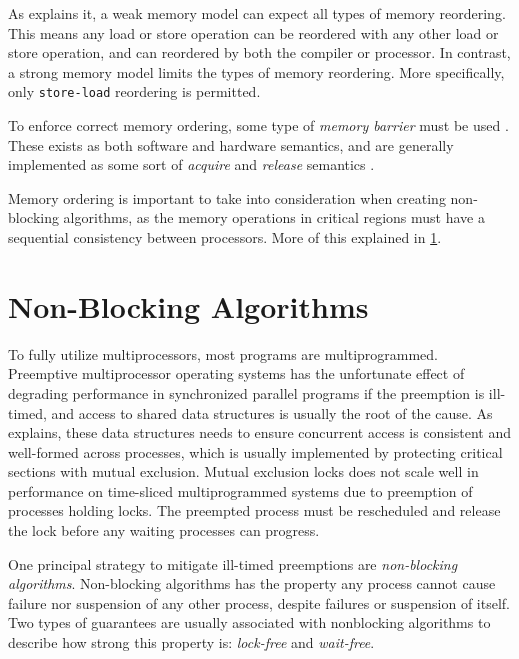 As \citet{preshing2012weakstrong} explains it, a weak memory model can expect all types of memory reordering. This means any load or store operation can be reordered with any other load or store operation, and can reordered by both the compiler or processor. In contrast, a strong memory model limits the types of memory reordering. More specifically, only \texttt{store\hyp{}load} reordering is permitted. 

To enforce correct memory ordering, some type of \textit{memory barrier} must be used \citep{preshing2012barriers,preshing2012lockfree}. These exists as both software and hardware semantics, and are generally implemented as some sort of \textit{acquire} and \textit{release} semantics \citep{preshing2012acquire}.

Memory ordering is important to take into consideration when creating non\hyp{}blocking algorithms, as the memory operations in critical regions must have a sequential consistency between processors. More of this explained in \cref{sec:nonblocking_algorithms}.


\section{Non\hyp{}Blocking Algorithms}
\label{sec:nonblocking_algorithms}


To fully utilize multiprocessors, most programs are multiprogrammed. Preemptive multiprocessor operating systems has the unfortunate effect of degrading performance in synchronized parallel programs if the preemption is ill\hyp{}timed, and access to shared data structures is usually the root of the cause. As \citet{michael1998nonblocking} explains, these data structures needs to ensure concurrent access is consistent and well\hyp{}formed across processes, which is usually implemented by protecting critical sections with mutual exclusion. Mutual exclusion locks does not scale well in performance on time\hyp{}sliced multiprogrammed systems \citep{zahorjan1991effect} due to preemption of processes holding locks. The preempted process must be rescheduled and release the lock before any waiting processes can progress.

One principal strategy to mitigate ill\hyp{}timed preemptions are \textit{non\hyp{}blocking algorithms}. Non\hyp{}blocking algorithms has the property any process cannot cause failure nor suspension of any other process, despite failures or suspension of itself. Two types of guarantees are usually associated with nonblocking algorithms to describe how strong this property is: \textit{lock\hyp{}free} and \textit{wait\hyp{}free}. 

